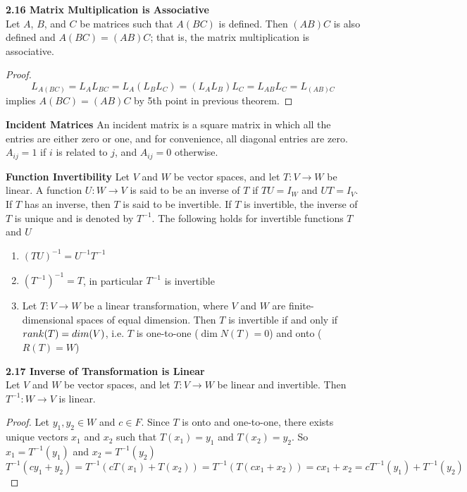 \documentclass[11pt]{article}
\begin{document}
\begin{theorem*}
    \textbf{2.16 Matrix Multiplication is Associative} \\
    Let $A$, $B$, and $C$ be matrices such that $A(BC)$ is defined. Then $(AB)C$ is also defined and $A(BC)=(AB)C$; that is, the matrix multiplication is associative. 
    \begin{proof}
        \[
            L_{A(BC)} = L_A L_{BC} = L_A(L_B L_C) = (L_A L_B) L_C = L_{AB}L_C = L_{(AB)C} 
        \]
        implies $A(BC) = (AB)C$ by 5th point in previous theorem. 
    \end{proof}
\end{theorem*}


\begin{defn*}
    \textbf{Incident Matrices} An incident matrix is a square matrix in which all the entries are either zero or one, and for convenience, all diagonal entries are zero. $A_{ij}=1$ if $i$ is related to $j$, and $A_{ij}=0$ otherwise. 
\end{defn*}



\begin{defn*}
    \textbf{Function Invertibility} Let $V$ and $W$ be vector spaces, and let $T:V\to W$ be linear. A function $U:W\to V$ is said to be an inverse of $T$ if $TU = I_W$ and $UT = I_V$. If $T$ has an inverse, then $T$ is said to be invertible. If $T$ is invertible, the inverse of $T$ is unique and is denoted by $T^{-1}$. The following holds for invertible functions $T$ and $U$
    \begin{enumerate}
        \item $(TU)^{-1} = U^{-1} T^{-1}$ 
        \item $(T^{-1})^{-1} = T$, in particular $T^{-1}$ is invertible 
        \item Let $T:V\to W$ be a linear transformation, where $V$ and $W$ are finite-dimensional spaces of equal dimension. Then $T$ is invertible if and only if $rank(T) = dim(V)$, i.e. $T$ is one-to-one ($\dim{N(T)}=0$) and onto ($R(T)=W$)
    \end{enumerate}
\end{defn*}


\begin{theorem*}
    \textbf{2.17 Inverse of Transformation is Linear}\\
    Let $V$ and $W$ be vector spaces, and let $T:V\to W$ be linear and invertible. Then $T^{-1} : W\to V$ is linear. \\ 
    \begin{proof}
        Let $y_1,y_2\in W$ and $c\in F$. Since $T$ is onto and one-to-one, there exists unique vectors $x_1$ and $x_2$ such that $T(x_1) = y_1$ and $T(x_2) = y_2$. So $x_1 = T^{-1}(y_1)$ and $x_2 = T^{-1}(y_2)$
        \[
            T^{-1}(cy_1 + y_2) = T^{-1}(cT(x_1) + T(x_2)) = T^{-1}(T(cx_1 + x_2)) = cx_1 + x_2 
            = cT^{-1}(y_1) + T^{-1}(y_2)
        \]
    \end{proof}
\end{theorem*}
\end{document}
